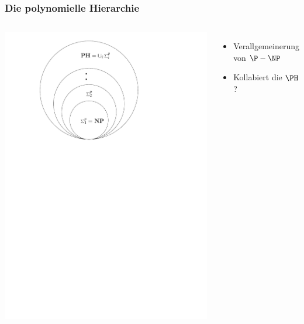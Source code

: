 \begin{frame}
	\frametitle{Die polynomielle Hierarchie}
	\begin{columns}
		\includegraphics[scale = 0.4]{images/polyhierarchy.pdf}
		\begin{itemize}[<+->]
			\item Verallgemeinerung von $\P-\NP$
			\item Kollabiert die $\PH$?
		\end{itemize}
	\end{columns}	
	\end{frame}
	
	